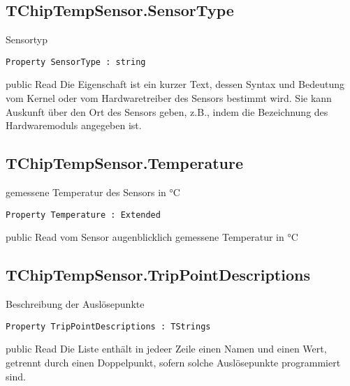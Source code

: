 \subsection{TChipTempSensor.SensorType}
\label{computer:chiptemp:tchiptempsensor:sensortype}
\begin{FPCList}
\Synopsis
Sensortyp\Declaration 

\begin{verbatim}
Property SensorType : string
\end{verbatim}
\Visibility
public
\Access
Read
\Description
Die Eigenschaft ist ein kurzer Text, dessen Syntax und Bedeutung vom Kernel oder vom Hardwaretreiber des Sensors bestimmt wird. Sie kann Auskunft über den Ort des Sensors geben, z.B., indem die Bezeichnung des Hardwaremoduls angegeben ist.\end{FPCList}
\subsection{TChipTempSensor.Temperature}
\label{computer:chiptemp:tchiptempsensor:temperature}
\begin{FPCList}
\Synopsis
gemessene Temperatur des Sensors in °C\Declaration 

\begin{verbatim}
Property Temperature : Extended
\end{verbatim}
\Visibility
public
\Access
Read
\Description
vom Sensor augenblicklich gemessene Temperatur in °C\end{FPCList}
\subsection{TChipTempSensor.TripPointDescriptions}
\label{computer:chiptemp:tchiptempsensor:trippointdescriptions}
\begin{FPCList}
\Synopsis
Beschreibung der Auslösepunkte\Declaration 

\begin{verbatim}
Property TripPointDescriptions : TStrings
\end{verbatim}
\Visibility
public
\Access
Read
\Description
Die Liste enthält in jedeer Zeile einen Namen und einen Wert, getrennt durch einen Doppelpunkt, sofern solche Auslösepunkte programmiert sind.\end{FPCList}
